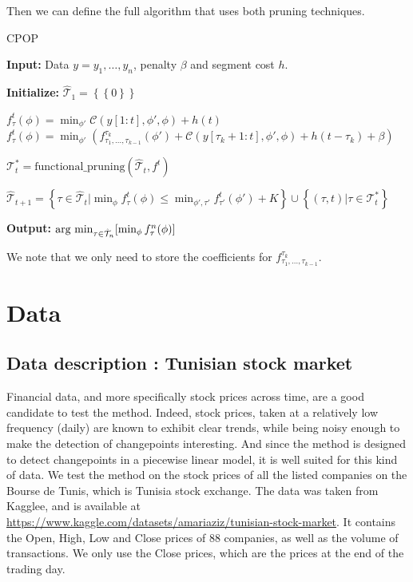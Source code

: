 \documentclass[11pt]{article}
\newcommand{\jump}{\newline\newline}
\begin{document}
Then we can define the full algorithm that uses both pruning techniques.
\begin{algorithm}[H]
    \caption{CPOP}
    \begin{algorithmic}[1]
        \State \textbf{Input:} Data $y=y_1,\dots,y_n$, penalty $\beta$ and segment cost $h$.

        \State \textbf{Initialize:} $\hat{\mathcal{T}}_1=\left\{\left\{0\right\}\right\}$

         
        \If {$\tau = \left\{0\right\}$}
        \State $f^t_{\tau}(\phi)=\min_{\phi'}\mathcal{C}(y[1:t],\phi',\phi)+h(t)$
        \Else {}
        \State $f^t_{\tau}(\phi)=\min_{\phi'}\left(f^{\tau_k}_{\tau_1,\dots,\tau_{k-1}}(\phi')+\mathcal{C}(y[\tau_k+1:t],\phi',\phi)+h(t-\tau_k)+\beta\right)$
        \EndIf
        \EndFor

        \State $\mathcal{T}^*_t = \text{functional\_pruning}(\hat{\mathcal{T}}_t, f^t)$

        \State $\hat{\mathcal{T}}_{t+1}= \left\{\tau\in \hat{\mathcal{T}}_t \big| \min_\phi f_\tau^t(\phi)\leq \min_{\phi',\tau'}f_{\tau'}^t(\phi')+K\right\}\cup \left\{(\tau, t)\big|\tau\in \mathcal{T}^*_t\right\}$
        \EndFor

        \State \textbf{Output:} $\operatorname*{\mbox{arg min}}_{\tau\in \hat{\mathcal{T}}_n}[\min_\phi f^n_\tau(\phi)]$
    \end{algorithmic}
\end{algorithm}
We note that we only need to store the coefficients for $f^{\tau_k}_{\tau_1,\dots,\tau_{k-1}}$.

\section{Data}
\subsection{Data description : Tunisian stock market}
Financial data, and more specifically stock prices across time, are a good candidate to test the method. Indeed, stock prices, taken at a relatively low frequency (daily) are known to exhibit clear trends, while being noisy enough to make the detection of changepoints interesting. And since the method is designed to detect changepoints in a piecewise linear model, it is well suited for this kind of data.
\jump
We test the method on the stock prices of all the listed companies on the Bourse de Tunis, which is Tunisia stock exchange. The data was taken from Kagglee, and is available at \url{https://www.kaggle.com/datasets/amariaziz/tunisian-stock-market}. It contains the Open, High, Low and Close prices of 88 companies, as well as the volume of transactions. We only use the Close prices, which are the prices at the end of the trading day.
\end{document}
